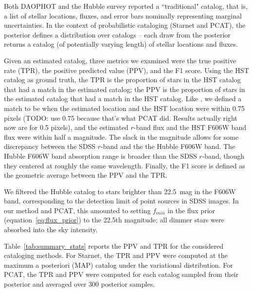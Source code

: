 Both DAOPHOT and the Hubble survey reported a ``traditional" catalog, that is, a list of stellar locations, fluxes, and 
error bars nominally representing marginal uncertainties.
In the context of probabilistic cataloging (Starnet and PCAT), the posterior 
defines a distribution over catalogs -- each draw from the posterior returns a catalog 
(of potentially varying length) of stellar locations and fluxes. 

Given an estimated catalog, three metrics we examined were the true positive rate (TPR), the positive predicted value (PPV), and the F1 score. Using the HST catalog as ground truth, the TPR is the proportion of stars in the HST catalog that had a match in the estimated catalog;
the PPV is the proportion of stars in the estimated catalog that had a match in the HST catalog. Like \cite{Portillo_2017, Feder_2019}, we defined a match to be when the estimated location and the HST location were within 0.75 pixels
(TODO: use 0.75 because that's what PCAT did. Results actually right now are for 0.5 pixels),
and the estimated $r$-band flux and the HST F606W band flux were within half a
magnitude. The slack in the magnitude allows for some discrepancy between the 
SDSS $r$-band and the the Hubble F606W band. The Hubble F606W band absorption range is broader than the SDSS $r$-band, though they centered at roughly the same wavelength. Finally, the F1 score is defined as the geometric average between the PPV and the TPR. 

We filtered the Hubble catalog to stars brighter than 22.5~mag in the F606W band, corresponding to the detection limit of point sources in SDSS images. In our method and PCAT, this amounted to setting $f_{min}$ in the flux prior (equation~\ref{eq:flux_prior})
to the 22.5th magnitude; all dimmer stars were absorbed into the sky intensity. 

Table~\ref{tab:summary_stats} reports the PPV and TPR for the considered cataloging methods.
For Starnet, the TPR and PPV were computed at the maximum a posteriori (MAP) catalog under
the variational distribution. For PCAT, the TPR and PPV were computed for each catalog sampled from their posterior and averaged over 300 posterior samples. 


